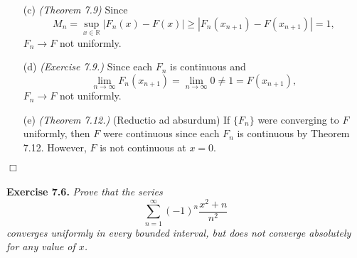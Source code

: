 \documentclass{article}
\begin{document}
\begin{enumerate}
\begin{enumerate}
  \item[(c)]
  \emph{(Theorem 7.9)}
  Since
  \[
    M_n
    = \sup_{x \in \mathbb{R}}|F_n(x) - F(x)|
    \geq |F_n(x_{n+1}) - F(x_{n+1})| = 1,
  \]
  $F_n \to F$ not uniformly.

  \item[(d)]
  \emph{(Exercise 7.9.)}
  Since
  each $F_n$ is continuous and
  \[
    \lim_{n \to \infty} F_n(x_{n+1}) = \lim_{n \to \infty} 0 \neq 1 = F(x_{n+1}),
  \]
  $F_n \to F$ not uniformly.

  \item[(e)]
  \emph{(Theorem 7.12.)}
  (Reductio ad absurdum)
  If $\{F_n\}$ were converging to $F$ uniformly, then
  $F$ were continuous since each $F_n$ is continuous by Theorem 7.12.
  However, $F$ is not continuous at $x = 0$.
  \end{enumerate}
\end{enumerate}
$\Box$ \\\\






\textbf{Exercise 7.6.}
\emph{Prove that the series
\[
  \sum_{n=1}^{\infty} (-1)^n \frac{x^2+n}{n^2}
\]
converges uniformly in every bounded interval,
but does not converge absolutely for any value of $x$.} \\
\end{document}
